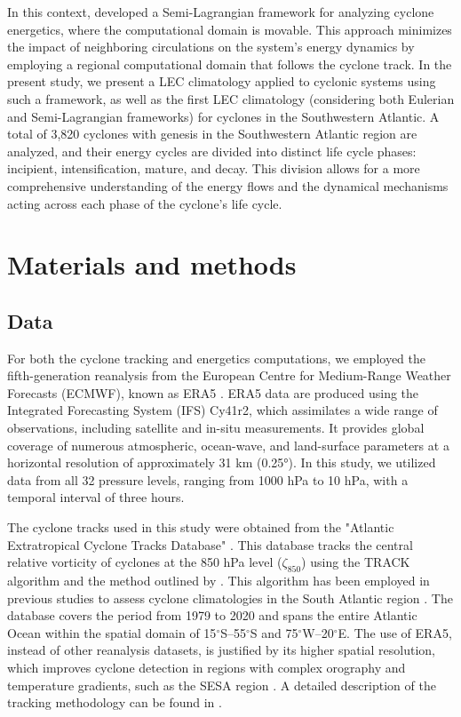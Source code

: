\documentclass[pdflatex,sn-chicago]{sn-jnl}%
\theoremstyle{plain}
\theoremstyle{definition}
\theoremstyle{remark}
\theoremstyle{definition}
\begin{document}
In this context, \citet{michaelides1999quasi} developed a Semi-Lagrangian framework for analyzing cyclone energetics, where the computational domain is movable. This approach minimizes the impact of neighboring circulations on the system's energy dynamics by employing a regional computational domain that follows the cyclone track. In the present study, we present a LEC climatology applied to cyclonic systems using such a framework, as well as the first LEC climatology (considering both Eulerian and Semi-Lagrangian frameworks) for cyclones in the Southwestern Atlantic. A total of 3,820 cyclones with genesis in the Southwestern Atlantic region are analyzed, and their energy cycles are divided into distinct life cycle phases: incipient, intensification, mature, and decay. This division allows for a more comprehensive understanding of the energy flows and the dynamical mechanisms acting across each phase of the cyclone's life cycle.

\section{Materials and methods}

\subsection{Data}\label{sec:data}

For both the cyclone tracking and energetics computations, we employed the fifth-generation reanalysis from the European Centre for Medium-Range Weather Forecasts (ECMWF), known as ERA5 \citep{hersbach2020era5}. ERA5 data are produced using the Integrated Forecasting System (IFS) Cy41r2, which assimilates a wide range of observations, including satellite and in-situ measurements. It provides global coverage of numerous atmospheric, ocean-wave, and land-surface parameters at a horizontal resolution of approximately 31 km (0.25°). In this study, we utilized data from all 32 pressure levels, ranging from 1000 hPa to 10 hPa, with a temporal interval of three hours.

The cyclone tracks used in this study were obtained from the "Atlantic Extratropical Cyclone Tracks Database" \citep{gramcianinov2020data}. This database tracks the central relative vorticity of cyclones at the 850 hPa level (\(\zeta_{850}\)) using the TRACK algorithm \citep{hodges1994general, hodges1995feature} and the method outlined by \citet{hoskins2002new}. This algorithm has been employed in previous studies to assess cyclone climatologies in the South Atlantic region \citep{gramcianinov2019properties,gramcianinov2020analysis,couto2024new}. The database covers the period from 1979 to 2020 and spans the entire Atlantic Ocean within the spatial domain of 15\(^\circ\)S–55\(^\circ\)S and 75\(^\circ\)W–20\(^\circ\)E. The use of ERA5, instead of other reanalysis datasets, is justified by its higher spatial resolution, which improves cyclone detection in regions with complex orography and temperature gradients, such as the SESA region \citep{gramcianinov2020analysis}. A detailed description of the tracking methodology can be found in \citet{gramcianinov2020analysis}.
\end{document}
